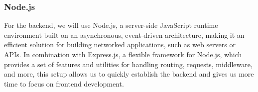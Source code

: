 \subsubsection*{Node.js}
For the backend, we will use Node.js, a server-side JavaScript runtime environment built on an asynchronous, event-driven architecture, making it an efficient solution for building networked applications, such as web servers or APIs. In combination with Express.js, a flexible framework for Node.js, which provides a set of features and utilities for handling routing, requests, middleware, and more, this setup allows us to quickly establish the backend and gives us more time to focus on frontend development.